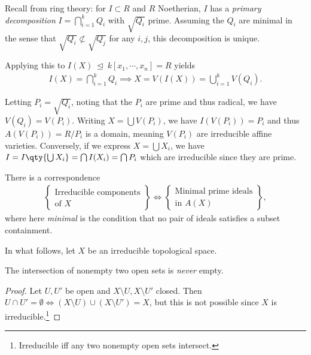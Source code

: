 Recall from ring theory: for \(I\subset R\) and \(R\) Noetherian, \(I\)
has a \emph{primary decomposition} \(I = \bigcap_{i=1}^k Q_i\) with
\(\sqrt{Q_i}\) prime. Assuming the \(Q_i\) are minimal in the sense that
\(\sqrt{Q_i} \not\subset \sqrt{Q_j}\) for any \(i, j\), this
decomposition is unique.

Applying this to \(I(X) {~\trianglelefteq~}k[x_1, \cdots, x_{n}] = R\)
yields
\begin{align*}  
I(X) = \bigcap_{i=1}^k Q_i 
\implies
X  = V(I(X)) = \bigcup_{i=1}^k V(Q_i)
.\end{align*}

Letting \(P_i = \sqrt{Q_i}\), noting that the \(P_i\) are prime and thus
radical, we have \(V(Q_i) = V(P_i)\). Writing \(X = \bigcup V(P_i)\), we
have \(I(V(P_i)) = P_i\) and thus \(A(V(P_i)) = R/P_i\) is a domain,
meaning \(V(P_i)\) are irreducible affine varieties. Conversely, if we
express \(X = \bigcup X_i\), we have
\(I = I\qty{\bigcup X_i} = \bigcap I(X_i) = \bigcap P_i\) which are
irreducible since they are prime.

\begin{remark}

There is a correspondence
\begin{align*}  
\left\{{\substack{\text{Irreducible components} \\ \text{of } X}}\right\} 
\iff
\left\{{\substack{\text{Minimal prime ideals} \\ \text{in } A(X)}}\right\}
,\end{align*}
where here \emph{minimal} is the condition that no pair of ideals
satisfies a subset containment.

\end{remark}

In what follows, let \(X\) be an irreducible topological space.

\begin{proposition}[1]

The intersection of nonempty two open sets is \emph{never} empty.

\end{proposition}

\begin{proof}

Let \(U, U'\) be open and \(X\setminus U, X\setminus U'\) closed. Then
\(U\cap U' = \emptyset \iff (X\setminus U) \cup(X\setminus U') = X\),
but this is not possible since \(X\) is irreducible.\footnote{Irreducible
  iff any two nonempty open sets intersect.}

\end{proof}


